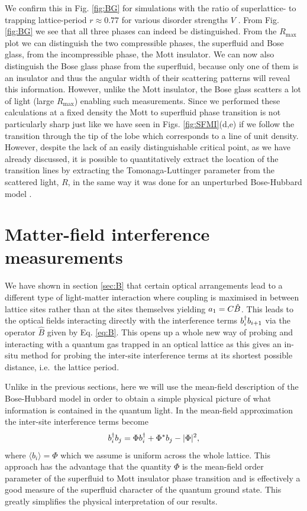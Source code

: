 We confirm this in Fig. \ref{fig:BG} for simulations with the ratio of
superlattice- to trapping lattice-period $r\approx 0.77$ for various
disorder strengths $V$ \cite{roux2008}. From Fig. \ref{fig:BG} we see
that all three phases can indeed be distinguished. From the
$R_\mathrm{max}$ plot we can distinguish the two compressible phases,
the superfluid and Bose glass, from the incompressible phase, the Mott
insulator. We can now also distinguish the Bose glass phase from the
superfluid, because only one of them is an insulator and thus the
angular width of their scattering patterns will reveal this
information. However, unlike the Mott insulator, the Bose glass
scatters a lot of light (large $R_\mathrm{max}$) enabling such
measurements. Since we performed these calculations at a fixed density
the Mott to superfluid phase transition is not particularly sharp
\cite{cazalilla2011, ejima2011, kuhner2000, pino2012, pino2013} just
like we have seen in Figs. \ref{fig:SFMI}(d,e) if we follow the
transition through the tip of the lobe which corresponds to a line of
unit density. However, despite the lack of an easily distinguishable
critical point, as we have already discussed, it is possible to
quantitatively extract the location of the transition lines by
extracting the Tomonaga-Luttinger parameter from the scattered light,
$R$, in the same way it was done for an unperturbed Bose-Hubbard model
\cite{ejima2011}.

\section{Matter-field interference measurements}

We have shown in section \ref{sec:B} that certain optical arrangements
lead to a different type of light-matter interaction where coupling is
maximised in between lattice sites rather than at the sites themselves
yielding $a_1 = C\hat{B}$. This leads to the optical fields
interacting directly with the interference terms $b^\dagger_i b_{i+1}$ via
the operator $\hat{B}$ given by Eq. \eqref{eq:B}. This opens up a
whole new way of probing and interacting with a quantum gas trapped in
an optical lattice as this gives an in-situ method for probing the
inter-site interference terms at its shortest possible distance,
i.e.~the lattice period.

Unlike in the previous sections, here we will use the mean-field
description of the Bose-Hubbard model in order to obtain a simple
physical picture of what information is contained in the quantum
light. In the mean-field approximation the inter-site interference
terms become
\begin{equation}
  b^\dagger_i b_j = \Phi b^\dagger_i + \Phi^* b_j - |\Phi|^2,
\end{equation}
where $\langle b_i \rangle = \Phi$ which we assume is uniform across
the whole lattice. This approach has the advantage that the quantity
$\Phi$ is the mean-field order parameter of the superfluid to Mott
insulator phase transition and is effectively a good measure of the
superfluid character of the quantum ground state. This greatly
simplifies the physical interpretation of our results.

